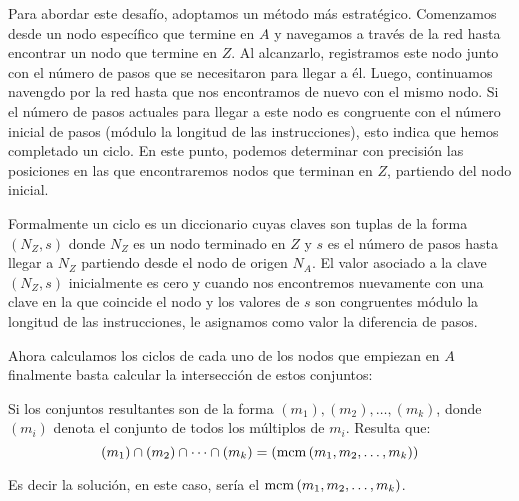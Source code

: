 \documentclass[a4paper,12pt]{article}
\begin{document}
Para abordar este desafío, adoptamos un método más estratégico. Comenzamos desde un nodo específico que termine en $A$ y navegamos a través de la red hasta encontrar un nodo que termine en $Z$. Al alcanzarlo, registramos este nodo junto con el número de pasos que se necesitaron para llegar a él. Luego, continuamos navengdo por la red hasta que nos encontramos de nuevo con el mismo nodo. Si el número de pasos actuales para llegar a este nodo es congruente con el número inicial de pasos (módulo la longitud de las instrucciones), esto indica que hemos completado un ciclo. En este punto, podemos determinar con precisión las posiciones en las que encontraremos nodos que terminan en $Z$, partiendo del nodo inicial.

Formalmente un ciclo es un diccionario cuyas claves son tuplas de la forma $(N_Z, s)$ donde $N_Z$ es un nodo terminado en $Z$ y $s$ es el número de pasos hasta llegar a $N_Z$ partiendo desde el nodo de origen $N_A$. El valor asociado a la clave $(N_Z, s)$ inicialmente es cero y cuando nos encontremos nuevamente con una clave en la que coincide el nodo y los valores de $s$ son congruentes módulo la longitud de las instrucciones, le asignamos como valor la diferencia de pasos.

Ahora calculamos los ciclos de cada uno de los nodos que empiezan en $A$ finalmente basta calcular la intersección de estos conjuntos: 

Si los conjuntos resultantes son de la forma $(m_1), (m_2),\dots, (m_k)$, donde $(m_i)$ denota el conjunto de todos los múltiplos de $m_i$. Resulta que:
$$(m_1)\cap (m_2)\cap\cdots\cap(m_k)=(\operatorname{\rm mcm}\left(m_1,m_2,\dots,m_k\right))$$

Es decir la solución, en este caso, sería el $\operatorname{\rm mcm}\left(m_1,m_2,\dots,m_k\right)$.
\end{document}
